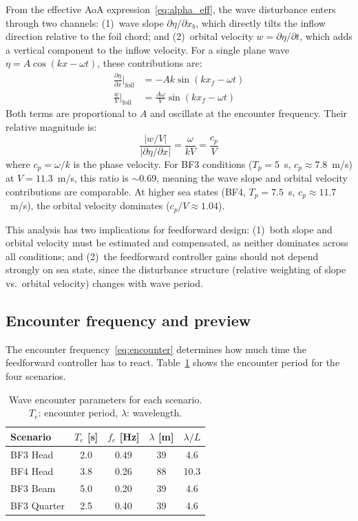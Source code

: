 \documentclass[review]{elsarticle}
\begin{document}
From the effective AoA expression~\eqref{eq:alpha_eff}, the wave
disturbance enters through two channels:
(1)~wave slope $\partial\eta/\partial x_b$, which directly tilts
the inflow direction relative to the foil chord; and
(2)~orbital velocity $w = \partial\eta/\partial t$, which adds a
vertical component to the inflow velocity.
For a single plane wave $\eta = A\cos(kx - \omega t)$, these
contributions are:
\begin{align}
  \frac{\partial\eta}{\partial x}\bigg|_\text{foil} &= -Ak\sin(kx_f - \omega t)
  \label{eq:slope_single} \\
  \frac{w}{V}\bigg|_\text{foil} &= \frac{A\omega}{V}\sin(kx_f - \omega t)
  \label{eq:orbital_single}
\end{align}
Both terms are proportional to $A$ and oscillate at the encounter
frequency.  Their relative magnitude is:
\begin{equation}
  \frac{|w/V|}{|\partial\eta/\partial x|} = \frac{\omega}{kV}
    = \frac{c_p}{V}
\end{equation}
where $c_p = \omega/k$ is the phase velocity.
For BF3 conditions ($T_p = 5$~s, $c_p \approx 7.8$~m/s) at
$V = 11.3$~m/s, this ratio is $\sim$0.69, meaning the wave slope
and orbital velocity contributions are comparable.
At higher sea states (BF4, $T_p = 7.5$~s, $c_p \approx 11.7$~m/s),
the orbital velocity dominates ($c_p/V \approx 1.04$).

This analysis has two implications for feedforward design:
(1)~both slope and orbital velocity must be estimated and
    compensated, as neither dominates across all conditions; and
(2)~the feedforward controller gains should not depend strongly on
    sea state, since the disturbance structure (relative weighting
    of slope vs.\ orbital velocity) changes with wave period.

\subsection{Encounter frequency and preview}

The encounter frequency~\eqref{eq:encounter} determines how much
time the feedforward controller has to react.
Table~\ref{tab:encounter} shows the encounter period for the four
scenarios.

\begin{table}[h]
\centering
\caption{Wave encounter parameters for each scenario.
$T_e$: encounter period, $\lambda$: wavelength.}
\label{tab:encounter}
\begin{tabular}{lcccc}
\toprule
Scenario & $T_e$ [s] & $f_e$ [Hz] & $\lambda$ [m] & $\lambda/L$ \\
\midrule
BF3 Head    & 2.0 & 0.49 & 39 & 4.6 \\
BF4 Head    & 3.8 & 0.26 & 88 & 10.3 \\
BF3 Beam    & 5.0 & 0.20 & 39 & 4.6 \\
BF3 Quarter & 2.5 & 0.40 & 39 & 4.6 \\
\bottomrule
\end{tabular}
\end{table}
\end{document}
